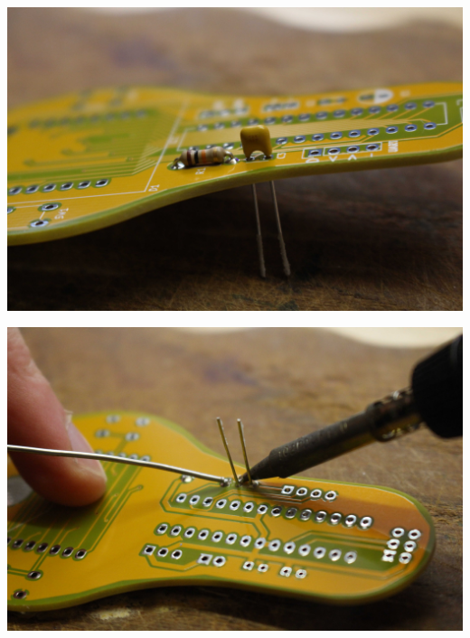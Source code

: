\documentclass{article}
\begin{document}
\begin{minipage}[b]{0.5\textwidth}
	\includegraphics[width=\textwidth]{Bilder/IMG_5548.JPG}
	\label{fig:}
\end{minipage}
\begin{minipage}[b]{0.5\textwidth}
	\includegraphics[width=\textwidth]{Bilder/IMG_5550.JPG}
	\label{fig:}
\end{minipage}
\end{document}
